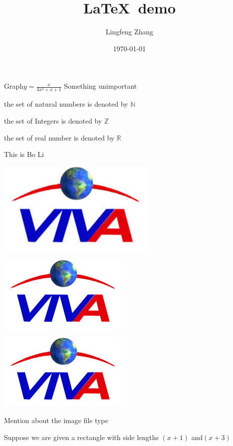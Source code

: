 \documentclass[11pt]{article}
\def\eq1{y=\frac{x}{3x^2+x+1}}
\def\labelaxes{Something unimportant}
\begin{document}
\tableofcontents

\title{\LaTeX \ demo}
\author{Lingfeng Zhang}
\date{\today}
\maketitle

Graph$\eq1$ \labelaxes

the set of natural numbers is denoted by $\mathbb{N}$

the set of Integers is denoted by $\mathbb{Z}$

the set of real number is denoted by $\mathbb{R}$

This is  Bo Li \\
\begin{center}\includegraphics[width=3in]{viva.jpeg}\end{center}
\begin{center}\includegraphics[scale=0.5]{viva.jpeg}\end{center}
\begin{center}\includegraphics[angle=45,scale=0.1]{viva.jpeg}\end{center}

Mention about the image file type

Suppose we are given a rectangle with side lengths $(x+1)$ and$(x+3)$
\end{document}
